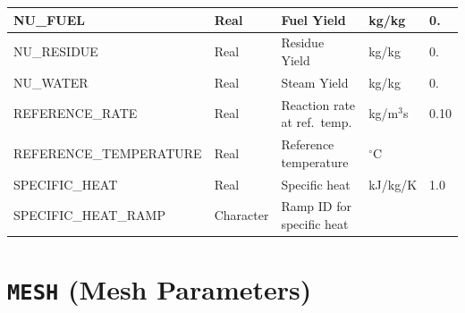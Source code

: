 \documentclass[11pt]{book}
\begin{document}
\begin{table}[H]
\begin{tabular*}{\textwidth}{@{\extracolsep{\fill}}|l|l|l|l|l|}
{\ct NU\_FUEL}                & Real        & Fuel Yield                  & kg/kg               & 0.     \\ \hline
{\ct NU\_RESIDUE}             & Real        & Residue Yield               & kg/kg               & 0.     \\ \hline
{\ct NU\_WATER  }             & Real        & Steam Yield                 & kg/kg               & 0.     \\ \hline
{\ct REFERENCE\_RATE}         & Real        & Reaction rate at ref.~temp. & kg/m$^3$s           & 0.10   \\ \hline
{\ct REFERENCE\_TEMPERATURE}  & Real        & Reference temperature       & $^\circ$C           &        \\ \hline
{\ct SPECIFIC\_HEAT}          & Real        & Specific heat               & kJ/kg/K             & 1.0    \\ \hline
{\ct SPECIFIC\_HEAT\_RAMP}    & Character   & Ramp ID for specific heat   &                     &        \\ \hline
\end{tabular*}
\end{table}

\vspace{\baselineskip}

\vfill

\clearpage
\section{\texorpdfstring{{\tt MESH}}{MESH} (Mesh Parameters)}

\hspace{1in}
\end{document}
